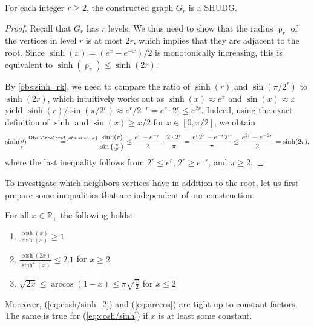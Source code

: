 \documentclass[a4paper,english,cleveref,thm-restate]{lipics-v2021}
\DeclareMathOperator{\rad}{\rho}
\begin{document}
\begin{lemma}\label{lem:hypergrid_shudg}
    For each integer $ r \geq 2 $, the constructed graph $ G_r $ is a SHUDG.
\end{lemma}
\begin{proof}
    Recall that $G_r$ has $r$ levels.
    We thus need to show that the radius $ \rad_r $ of the vertices in level $ r $ is at most $ 2r $, which implies that they are adjacent to the root.
    Since $ \sinh(x) = (e^x - e^{-x}) / 2$ is monotonically increasing, this is equivalent to $ \sinh(\rad_r) \leq \sinh(2r) $.
    
    By \cref{obs:sinh_rk}, we need to compare the ratio of $ \sinh(r) $ and $ \sin(\pi/2^r) $ to $ \sinh(2r) $, which intuitively works out as $ \sinh(x) \approx e^x $ and $ \sin(x) \approx x $ yield $ \sinh(r) / \sin(\pi/2^r) \approx e^r / 2^{-r} = e^r \cdot 2^r \leq e^{2r} $.
    Indeed, using the exact definition of $\sinh$ and $\sin(x) \ge x / 2$ for $x \in [0, \pi/2]$, we obtain
      \begin{equation*}
        \sinh(\rad_r) 
        \overset{\text{Obs } \labelcref{obs:sinh_rk}}{=} 
            \frac{\sinh(r)}{\sin\left( \frac{\pi}{2^r} \right)}
        \le \frac{e^r - e^{-r}}{2} \cdot \frac{2 \cdot 2^r}{\pi}
        = \frac{e^r 2^r - e^{-r} 2^{r}}{\pi}
        \le \frac{ e^{2r} - e^{-2r}}{2} = \sinh(2r),
      \end{equation*}
      where the last inequality follows from $2^r \le e^r$, $2^r \ge e^{-r}$, and $\pi \ge 2$.
\end{proof}

To investigate which neighbors vertices have in addition to the root, let us first prepare some inequalities that are independent of our construction.

\begin{lemma}\label{lem:hyp-ineq}
    \newlength{\extraspace}
    \setlength{\extraspace}{0.3em}
    For all $ x \in \mathbb{R}_+ $ the following holds:
    \vspace{\extraspace / 2}
    \begin{enumerate}[(1)]
        \setlength{\itemsep}{\extraspace}
        \item \label{eq:cosh/sinh}
            $ \frac{\cosh(x)}{\sinh(x)} \geq 1 $
        \item \label{eq:cosh/sinh_2}
            $ \frac{\cosh(2x)}{\sinh^2(x)} \leq 2.1 $ for $ x \geq 2 $
        \item \label{eq:arccos}
            $ \sqrt{2x} \leq \arccos(1-x) \leq \pi \sqrt{\frac{x}{2}} $ for $ x \leq 2 $
        \end{enumerate} \vspace{\extraspace / 2} Moreover, (\ref{eq:cosh/sinh_2}) and (\ref{eq:arccos}) are tight up to constant factors.
        The same is true for (\ref{eq:cosh/sinh}) if $x$ is at least some constant.
\end{lemma}
\end{document}
